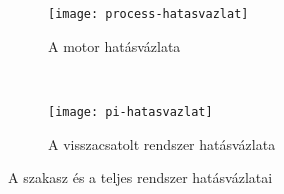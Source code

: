 \begin{figure}[H]
	\centering
	\begin{subfigure}[H]{\textwidth}
		\centering
		\texttt{[image: process-hatasvazlat]}
		\caption{A motor hatásvázlata}
		\label{fig:process-hatasvazlat}
	\end{subfigure}\\[15mm]
	
	\begin{subfigure}[H]{\textwidth}
		\centering
		\texttt{[image: pi-hatasvazlat]}
		\caption{A visszacsatolt rendszer hatásvázlata}
		\label{fig:pi-hatasvazlat}
	\end{subfigure}
	\caption{A szakasz és a teljes rendszer hatásvázlatai}
\end{figure}
